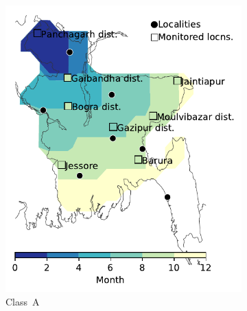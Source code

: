 \documentclass[11pt]{article}
\newcommand{\ald}{\alpha_{\ell d}}
\theoremstyle{definition}
\begin{document}
\begin{figure}[t]
    \centering
\begin{subfigure}[b]{.3\textwidth}
    \includegraphics[width=\textwidth]{../../cellular_automata/results/contour/BGD_model-A.pdf}
    \caption{Class~A \label{fig:bgdClassA}}  %
\end{subfigure}\hspace{.5cm}
\begin{subfigure}[b]{.3\textwidth}

\end{subfigure}
\end{figure}
\end{document}
